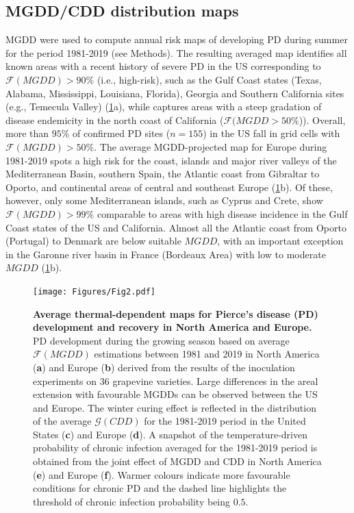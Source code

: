 \subsection{MGDD/CDD distribution maps}

MGDD were used to compute annual risk
maps of developing PD during summer for the period 1981-2019 (see Methods).
The resulting averaged map identifies all known areas with a recent history of
severe PD in the US corresponding to $\mathcal{F}(MGDD) > 90\%$ (i.e.,
high-risk), such as the Gulf Coast states (Texas, Alabama, Mississippi,
Louisiana, Florida), Georgia and Southern California sites (e.g., Temecula
Valley) (\cref{fig2}a), while captures areas with a steep gradation of
disease endemicity in the north coast of California ($\mathcal{F}(MGDD>50\%$)).
    Overall, more than $95\%$ of confirmed PD sites ($n = 155$) in the US
    fall in grid cells with $\mathcal{F}(MGDD) > 50 \%$.
    The average MGDD-projected map for Europe during 1981-2019 spots a high
    risk for the coast, islands and major river valleys of the Mediterranean
    Basin, southern Spain, the Atlantic coast from Gibraltar to Oporto, and
    continental areas of central and southeast Europe (\cref{fig2}b). Of these,
    however, only some Mediterranean islands, such as Cyprus and Crete, show
$\mathcal{F}(MGDD) > 99\%$ comparable to areas with high disease incidence in
    the Gulf Coast states of the US and California. Almost all the Atlantic
    coast from Oporto (Portugal) to Denmark are below suitable $MGDD$, with an
    important exception in the Garonne river basin in France (Bordeaux Area)
    with low to moderate $MGDD$ (\cref{fig2}b).

    \begin{figure}[H]
        \centering
        \texttt{[image: Figures/Fig2.pdf]}
        \caption{\textbf{Average thermal-dependent maps for Pierce's disease
                (PD)
                development and recovery in North America and Europe.} PD
            development during
            the growing season based on average $\mathcal{F}(MGDD)$ estimations
            between
            1981 and 2019 in North America (\textbf{a}) and Europe (\textbf{b})
            derived
            from the results of the inoculation experiments on 36 grapevine
            varieties.
            Large differences in the areal extension with favourable MGDDs can
            be observed
            between the US and Europe. The winter curing effect is reflected in
            the
            distribution of the average $\mathcal{G}(CDD)$ for the 1981-2019
            period in the
            United States (\textbf{c}) and Europe (\textbf{d}). A snapshot of
            the
            temperature-driven probability of chronic infection averaged for
            the 1981-2019
            period is obtained from the joint effect of MGDD and CDD in North
            America
            (\textbf{e}) and Europe (\textbf{f}). Warmer colours indicate more
            favourable
            conditions for chronic PD and the dashed line highlights the
            threshold of
            chronic infection probability being $0.5$.}
        \label{fig2}
    \end{figure}

